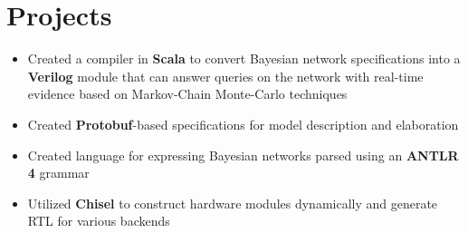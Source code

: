 \documentclass{moderncv}
\begin{document}
\begin{comment}
\cventry{Sep 2020 - Dec 2020}{Undergraduate Research Assistant}{University of Waterloo}{Waterloo ON}{}
{\begin{itemize}
    \item Implemented novel post-quantum cryptographic algorithms in \textbf{C}
    \item Designed and implemented cache-aware optimizations resulting in 60\% speed improvement
    \item Created custom boolean matrix library for use in cryptographic algorithms
\end{itemize}}
\end{comment}

\begin{comment}
    \cventry{May 2019 - Aug 2019}{Secure Software Developer}{ESCRYPT}{Waterloo ON}{}
{\begin{itemize}
    \item Implemented asynchronous process in \textbf{C++} for periodically provisioning \textbf{X.509} certificates on-vehicle, improving anonymity in the system by enabling certificate swapping
    \item Wrote ETSI-compliant tests using \textbf{GoogleTest} framework to prove functionality
\end{itemize}}
\end{comment}

\section{Projects}
{\begin{itemize}
    \item Created a compiler in \textbf{Scala} to convert Bayesian network specifications into a \textbf{Verilog} module that can answer queries on the network with real-time evidence based on Markov-Chain Monte-Carlo techniques
    \item Created \textbf{Protobuf}-based specifications for model description and elaboration
    \item Created language for expressing Bayesian networks parsed using an \textbf{ANTLR 4} grammar
    \item Utilized \textbf{Chisel} to construct hardware modules dynamically and generate RTL for various backends
\end{itemize}}
\end{document}
